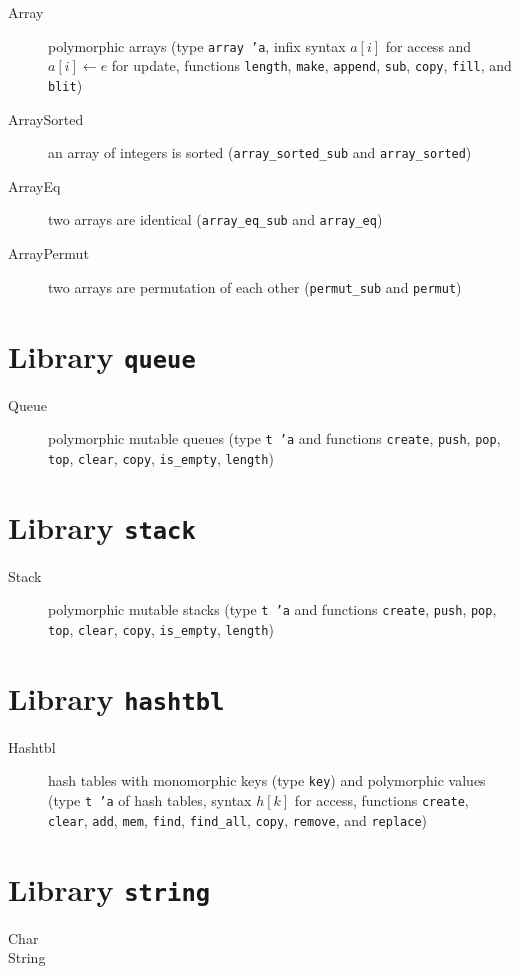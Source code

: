 \begin{description}
\item[Array]polymorphic arrays (type \texttt{array 'a}, infix
  syntax $a[i]$ for access and $a[i] \leftarrow e$ for update,
  functions \texttt{length}, \texttt{make}, \texttt{append},
  \texttt{sub}, \texttt{copy}, \texttt{fill}, and \texttt{blit})
\item[ArraySorted] an array of integers is sorted
  (\verb|array_sorted_sub| and \verb|array_sorted|)
\item[ArrayEq] two arrays are identical
  (\verb|array_eq_sub| and \verb|array_eq|)
\item[ArrayPermut] two arrays are permutation of each other
  (\verb|permut_sub| and \verb|permut|)
\end{description}

\section{Library \texttt{queue}}

\begin{description}
\item[Queue] polymorphic mutable queues (type \texttt{t 'a} and
  functions \texttt{create}, \texttt{push}, \texttt{pop},
  \texttt{top}, \texttt{clear}, \texttt{copy}, \texttt{is\_empty},
  \texttt{length})
\end{description}

\section{Library \texttt{stack}}

\begin{description}
\item[Stack] polymorphic mutable stacks (type \texttt{t 'a} and
  functions \texttt{create}, \texttt{push}, \texttt{pop},
  \texttt{top}, \texttt{clear}, \texttt{copy}, \texttt{is\_empty},
  \texttt{length})
\end{description}

\section{Library \texttt{hashtbl}}

\begin{description}
\item[Hashtbl] hash tables with monomorphic keys (type \texttt{key})
  and polymorphic values (type \texttt{t 'a} of hash tables, syntax
  $h[k]$ for access, functions \texttt{create}, \texttt{clear},
  \texttt{add}, \texttt{mem}, \texttt{find}, \texttt{find\_all},
  \texttt{copy}, \texttt{remove}, and \texttt{replace})
\end{description}

\section{Library \texttt{string}}

\begin{description}
\item[Char]
\item[String]
\end{description}

